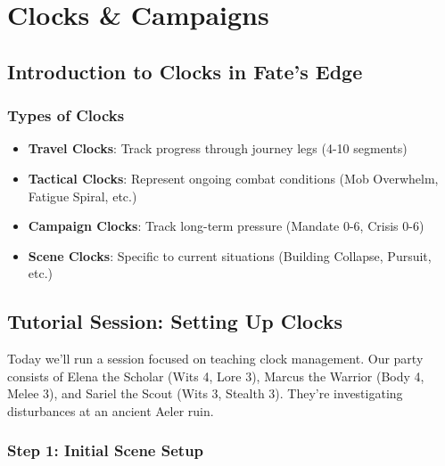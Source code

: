 \chapter{Clocks \& Campaigns}

\section*{Introduction to Clocks in Fate's Edge}


\subsection*{Types of Clocks}

\begin{itemize}[leftmargin=*]
\item \textbf{Travel Clocks}: Track progress through journey legs (4-10 segments)
\item \textbf{Tactical Clocks}: Represent ongoing combat conditions (Mob Overwhelm, Fatigue Spiral, etc.)
\item \textbf{Campaign Clocks}: Track long-term pressure (Mandate 0-6, Crisis 0-6)
\item \textbf{Scene Clocks}: Specific to current situations (Building Collapse, Pursuit, etc.)
\end{itemize}

\section*{Tutorial Session: Setting Up Clocks}

 Today we'll run a session focused on teaching clock management. Our party consists of Elena the Scholar (Wits 4, Lore 3), Marcus the Warrior (Body 4, Melee 3), and Sariel the Scout (Wits 3, Stealth 3). They're investigating disturbances at an ancient Aeler ruin.

\subsection*{Step 1: Initial Scene Setup}

